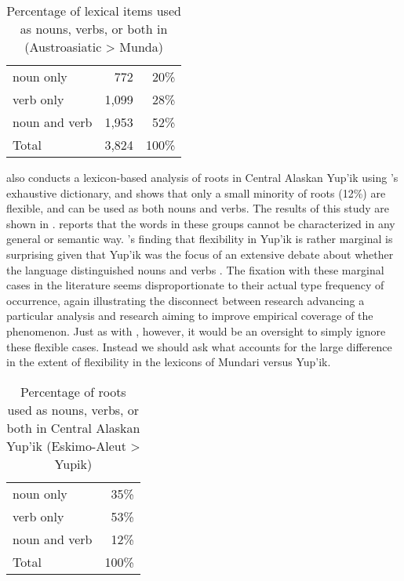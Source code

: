 \begin{table}[h]
  \centering
  \caption[Percentage of lexical items used as nouns, verbs, or both in Mundari (Austroasiatic > Munda)]{Percentage of lexical items used as nouns, verbs, or both in  (Austroasiatic > Munda) \parencite[383]{EvansOsada2005}}
  \label{tab:Evans-Osada-2005}
  \begin{tabular}{ l r r }
    \toprule
    noun only     &   772 &  20\% \\
    verb only     & 1,099 &  28\% \\
    noun and verb & 1,953 &  52\% \\
    \midrule
    Total         & 3,824 & 100\% \\
    \bottomrule
  \end{tabular}
\end{table}

\textcite[163]{Mithun2017} also conducts a lexicon-based analysis of roots in Central Alaskan Yup'ik using \citeauthor{Jacobson2012}'s \parencite*{Jacobson2012} exhaustive dictionary, and shows that only a small minority of roots (12\%) are flexible, and can be used as both nouns and verbs. The results of this study are shown in . \citeauthor{Mithun2017} reports that the words in these groups cannot be characterized in any general or semantic way. \citeauthor{Mithun2017}'s finding that flexibility in Yup'ik is rather marginal is surprising given that Yup'ik was the focus of an extensive debate about whether the language distinguished nouns and verbs \parencite{Sadock1999}. The fixation with these marginal cases in the literature seems disproportionate to their actual type frequency of occurrence, again illustrating the disconnect between research advancing a particular analysis and research aiming to improve empirical coverage of the phenomenon. Just as with , however, it would be an oversight to simply ignore these flexible cases. Instead we should ask what accounts for the large difference in the extent of flexibility in the lexicons of Mundari versus Yup'ik.

\begin{table}[h]
  \centering
  \caption[Percentage of roots used as nouns, verbs, or both in Central Alaskan Yup'ik (Eskimo-Aleut > Yupik)]{Percentage of roots used as nouns, verbs, or both in Central Alaskan Yup'ik (Eskimo-Aleut > Yupik) \parencite[163]{Mithun2017}}
  \label{tab:Mithun-2017}
  \begin{tabular}{ l r }
    \toprule
    noun only     &  35\% \\
    verb only     &  53\% \\
    noun and verb &  12\% \\
    \midrule
    Total         & 100\% \\
    \bottomrule
  \end{tabular}
\end{table}


